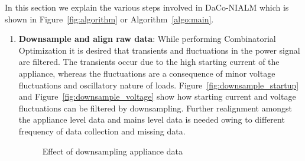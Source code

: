 \documentclass[conference]{IEEEtran}
\newcommand{\figref}[1]{Figure~\ref{#1}}
\newcommand{\algoref}[1]{Algorithm~\ref{#1}}
\begin{document}
In this section we explain the various steps involved in DaCo-NIALM which is shown in \figref{fig:algorithm} or \algoref{algo:main}.
\begin{enumerate}
\item \textbf{Downsample and align raw data}: While performing Combinatorial Optimization it is desired that transients and fluctuations in the power signal are filtered. The transients occur due to the high starting current of the appliance, whereas the fluctuations are a consequence of minor voltage fluctuations and oscillatory nature of loads. \figref{fig:downsample_startup} and \figref{fig:downsample_voltage} show how starting current and voltage fluctuations can be filtered by downsampling. 
Further realignment amongst the appliance level data and mains level data is needed owing to different frequency of data collection and missing data.
\begin{figure} 
	
  	\caption{Effect of downsampling appliance data}
    \label{fig:downsampling}
\end{figure}


\end{enumerate}
\end{document}

